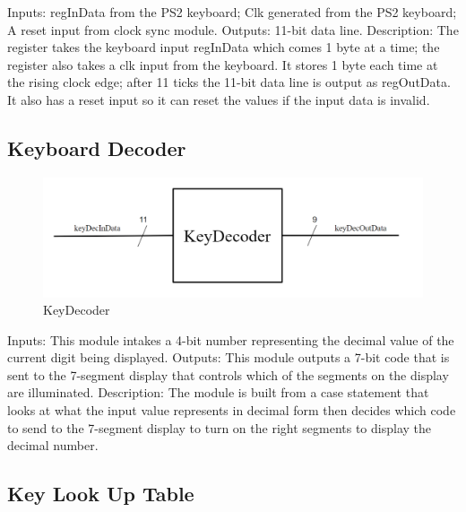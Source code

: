 \documentclass[a4paper]{article}
\begin{document}
Inputs: \newline
	regInData from the PS2 keyboard;\newline
    Clk generated from the PS2 keyboard;\newline
    A reset input from clock sync module.\newline\newline
Outputs: 11-bit data line.
\newline\newline
Description: The register takes the keyboard input regInData which comes 1 byte at a time; the register also takes a clk input from the keyboard. It stores 1 byte each time at the rising clock edge; after 11 ticks the 11-bit data line is output as regOutData. It also has a reset input so it can reset the values if the input data is invalid.  


\subsection{Keyboard Decoder}

\begin{figure}[h]
    \includegraphics[width=6in]{./Images/DiagramsYang/keyDec.png}
    \caption{KeyDecoder}
    \label{fig:6}
\end{figure}

Inputs: This module intakes a 4-bit number representing the decimal value of the current digit being displayed.
\newline\newline
Outputs: This module outputs a 7-bit code that is sent to the 7-segment display that controls which of the segments on the display are illuminated.
\newline\newline
Description: The module is built from a case statement that looks at what the input value represents in decimal form then decides which code to send to the 7-segment display to turn on the right segments to display the decimal number.


\subsection{ Key Look Up Table }
\end{document}
